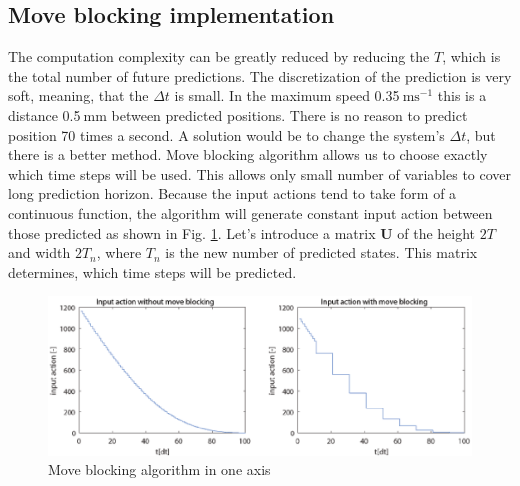 \documentclass[a4paper,11pt,titlepage]{article}
\newcommand{\jed}[1]{\ensuremath{~\mathrm{#1}}}
\begin{document}
\subsection{Move blocking implementation}
The computation complexity can be greatly reduced by reducing the $T$, which is the total number of future predictions. The discretization of the prediction is very soft, meaning, that the $\Delta t$ is small. In the maximum speed 0.35\jed{ms^{-1}} this is a distance 0.5\jed{mm} between predicted positions. There is no reason to predict position 70 times a second. A solution would be to change the system's $\Delta t$, but there is a better method. Move blocking algorithm allows us to choose exactly which time steps will be used. This allows only small number of variables to cover long prediction horizon. Because the input actions tend to take form of a continuous function, the algorithm will generate constant input action between those predicted as shown in Fig. \ref{fig:move_blocking}. Let's introduce a matrix $\textbf{U}$ of the height $2T$ and width $2T_n$, where $T_n$ is the new number of predicted states. This matrix determines, which time steps will be predicted.

\begin{figure}[h]
\includegraphics[width=1\textwidth]{fig/move_blocking_u.eps}
\caption{Move blocking algorithm in one axis}
\label{fig:move_blocking}
\end{figure}
\end{document}
